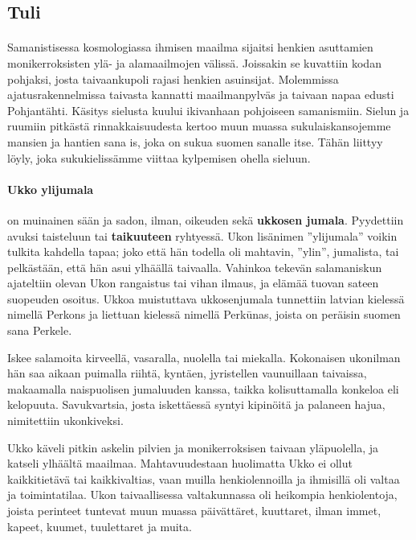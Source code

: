     
\subsection{Tuli}

  \paragraph{}Samanistisessa kosmologiassa ihmisen maailma sijaitsi henkien asuttamien 
    monikerroksisten ylä- ja alamaailmojen välissä. Joissakin se kuvattiin kodan pohjaksi, josta 
    taivaankupoli rajasi henkien asuinsijat. Molemmissa ajatusrakennelmissa taivasta kannatti 
    maailmanpylväs ja taivaan napaa edusti Pohjantähti. Käsitys sielusta kuului ikivanhaan 
    pohjoiseen samanismiin. Sielun ja ruumiin pitkästä rinnakkaisuudesta kertoo muun muassa 
    sukulaiskansojemme mansien ja hantien sana is, joka on sukua suomen sanalle itse. Tähän 
    liittyy löyly, joka sukukielissämme viittaa kylpemisen ohella sieluun. 
  \paragraph{Ukko ylijumala} on muinainen sään ja sadon, ilman, oikeuden sekä 
    \textbf{ukkosen jumala}. Pyydettiin avuksi taisteluun tai \textbf{taikuuteen} ryhtyessä. 
    Ukon lisänimen ”ylijumala” voikin tulkita kahdella tapaa; joko että hän todella oli mahtavin, 
    ”ylin”, jumalista, tai pelkästään, että hän asui ylhäällä taivaalla. Vahinkoa tekevän 
    salamaniskun ajateltiin olevan Ukon rangaistus tai vihan ilmaus, ja elämää tuovan sateen 
    suopeuden osoitus. Ukkoa muistuttava ukkosenjumala tunnettiin latvian kielessä nimellä 
    Perkons ja liettuan kielessä nimellä Perkūnas, joista on peräisin suomen sana Perkele. 

    Iskee salamoita kirveellä, vasaralla, nuolella tai miekalla. Kokonaisen ukonilman hän saa 
    aikaan puimalla riihtä, kyntäen, jyristellen vaunuillaan taivaissa, makaamalla naispuolisen 
    jumaluuden kanssa, taikka kolisuttamalla konkeloa eli kelopuuta. Savukvartsia, josta 
    iskettäessä syntyi kipinöitä ja palaneen hajua, nimitettiin ukonkiveksi. 

    Ukko käveli pitkin askelin pilvien ja monikerroksisen taivaan yläpuolella, ja katseli 
    ylhäältä maailmaa. Mahtavuudestaan huolimatta Ukko ei ollut kaikkitietävä tai kaikkivaltias, 
    vaan muilla henkiolennoilla ja ihmisillä oli valtaa ja toimintatilaa. Ukon taivaallisessa 
    valtakunnassa oli heikompia henkiolentoja, joista perinteet tuntevat muun muassa päivättäret, 
    kuuttaret, ilman immet, kapeet, kuumet, tuulettaret ja muita. 

